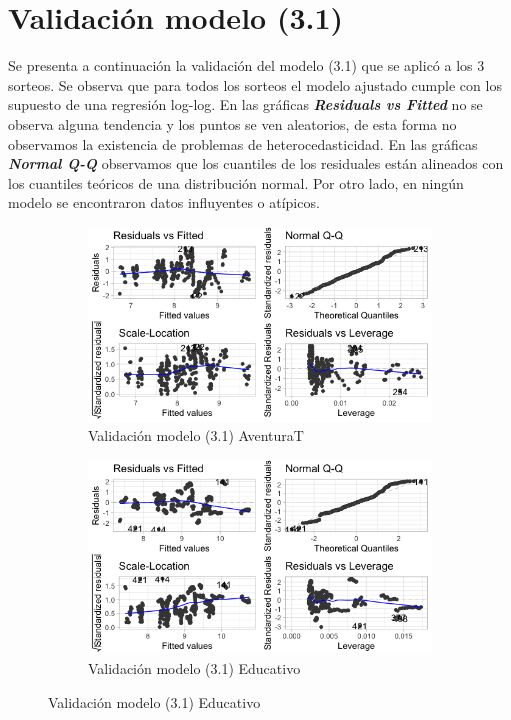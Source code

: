 \chapter{Validación modelo (3.1)}


Se presenta a continuación la validación del modelo (3.1) que se aplicó a los 3 sorteos. Se observa que para todos los sorteos el modelo ajustado cumple con los supuesto de una regresión log-log. En las gráficas \textbf{\textit{Residuals vs Fitted}} no se observa alguna tendencia y los puntos se ven aleatorios, de esta forma no observamos la existencia de problemas de heterocedasticidad. En las gráficas \textbf{\textit{Normal Q-Q}} observamos que los cuantiles de los residuales están alineados con los cuantiles teóricos de una distribución normal. Por otro lado, en ningún modelo se encontraron datos influyentes o atípicos.

\begin{figure}[H]
\centering
\label{fig:Validacion}
\begin{subfigure}
  \centering
  \caption{Validación modelo (3.1) AventuraT}
  \includegraphics[width=.85\linewidth]{Imagenes/log_aven.png}
\end{subfigure}%
\begin{subfigure}
  \centering
  \caption{Validación modelo (3.1) Educativo}
  \includegraphics[width=.85\linewidth]{Imagenes/log_educ.png}
\end{subfigure}
\end{figure}

